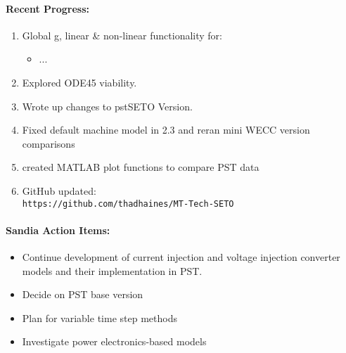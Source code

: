 \documentclass[12pt]{article}
\begin{document}
\begin{multicols}{2}
\raggedright

\paragraph{Recent Progress:}
	\begin{enumerate}
		\itemsep0em 
		\item Global g, linear \& non-linear functionality for:
		\begin{minipage}{\linewidth}
		\begin{multicols}{2}
				\begin{itemize}
		\itemsep0em 
				\footnotesize
					\item ...
				\end{itemize}
		\end{multicols}
		\end{minipage}
		\item Explored ODE45 viability.
		\item Wrote up changes to pstSETO Version.
		\item Fixed default machine model in 2.3 and reran mini WECC version comparisons
		\item created MATLAB plot functions to compare PST data
		\item GitHub updated:\\
	{\footnotesize	\verb|https://github.com/thadhaines/MT-Tech-SETO| }\\
	\end{enumerate}
	

\paragraph{Sandia Action Items:}
	\begin{itemize}
		\itemsep 0em 
			\item Continue development of current injection and voltage injection converter models and their implementation in PST.
			\item Decide on PST base version
			\item Plan for variable time step methods
			\item Investigate power electronics-based models
	\end{itemize}


\end{multicols}
\end{document}
